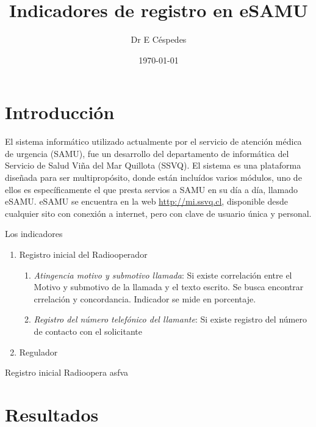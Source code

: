 \documentclass{article}
\title{Indicadores de registro en eSAMU}
\author[1]{Dr E Céspedes}
\affil[1]{Tecnologías SAMU Viña del Mar}
\date{\today}
\begin{document}
\maketitle


\tableofcontents

\section{Introducción}
El sistema informático utilizado actualmente por el servicio de atención médica de urgencia (SAMU), fue un desarrollo del departamento de informática del Servicio de Salud Viña del Mar Quillota (SSVQ). El sistema es una plataforma diseñada para ser multipropósito, donde están incluídos varios módulos, uno de ellos es específicamente el que presta servios a SAMU en su día a día, llamado eSAMU. eSAMU se encuentra en la web  \url{http://mi.ssvq.cl}, disponible desde cualquier sito con conexión a internet, pero con clave de usuario única y personal.


Los indicadores
\begin{enumerate}

\item Registro inicial del Radiooperador
	\begin{enumerate}
	\item \emph{Atingencia motivo y submotivo llamada}: Si existe correlación entre el Motivo y submotivo de la llamada y el texto escrito. Se busca encontrar crrelación y concordancia. Indicador se mide en porcentaje.
	
	\item \emph{Registro del número telefónico del llamante}: Si existe registro del número de contacto con el solicitante

	\end{enumerate}
\item Regulador

\end{enumerate}
Registro inicial Radioopera
asfva



\section{Resultados}



\end{document}
